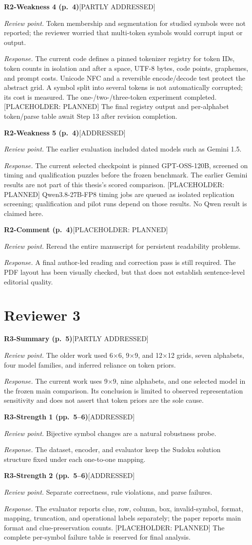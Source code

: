 \documentclass[10pt,a4paper]{article}
\newcommand{\Done}{\textcolor{done}{\textsf{[ADDRESSED]}}}
\newcommand{\Partial}{\textcolor{pending}{\textsf{[PARTLY ADDRESSED]}}}
\newcommand{\Planned}{\textcolor{pending}{\textsf{[PLACEHOLDER: PLANNED]}}}
\newcommand{\itemresponse}[4]{%
  \Needspace{5\baselineskip}%
  \par\vspace{0.65\baselineskip}%
  \noindent\textbf{#1}\quad #2\par
  \noindent\emph{Review point.} #3\par
  \noindent\emph{Response.} #4\par
}
\begin{document}
\itemresponse{R2-Weakness 4 (p.~4)}{\Partial}{Token membership and segmentation for studied symbols were not reported; the reviewer worried that multi-token symbols would corrupt input or output.}{The current code defines a pinned tokenizer registry for token IDs, token counts in isolation and after a space, UTF-8 bytes, code points, graphemes, and prompt costs. Unicode NFC and a reversible encode/decode test protect the abstract grid. A symbol split into several tokens is not automatically corrupted; its cost is measured. The one-/two-/three-token experiment completed. \Planned{} The final registry output and per-alphabet token/parse table await Step 13 after revision completion.}

\itemresponse{R2-Weakness 5 (p.~4)}{\Done}{The earlier evaluation included dated models such as Gemini 1.5.}{The current selected checkpoint is pinned GPT-OSS-120B, screened on timing and qualification puzzles before the frozen benchmark. The earlier Gemini results are not part of this thesis's scored comparison. \Planned{} Qwen3.8-27B-FP8 timing jobs are queued as isolated replication screening; qualification and pilot runs depend on those results. No Qwen result is claimed here.}

\itemresponse{R2-Comment (p.~4)}{\Planned}{Reread the entire manuscript for persistent readability problems.}{A final author-led reading and correction pass is still required. The PDF layout has been visually checked, but that does not establish sentence-level editorial quality.}

\section*{Reviewer 3}

\itemresponse{R3-Summary (p.~5)}{\Partial}{The older work used 6$\times$6, 9$\times$9, and 12$\times$12 grids, seven alphabets, four model families, and inferred reliance on token priors.}{The current work uses 9$\times$9, nine alphabets, and one selected model in the frozen main comparison. Its conclusion is limited to observed representation sensitivity and does not assert that token priors are the sole cause.}

\itemresponse{R3-Strength 1 (pp.~5--6)}{\Done}{Bijective symbol changes are a natural robustness probe.}{The dataset, encoder, and evaluator keep the Sudoku solution structure fixed under each one-to-one mapping.}

\itemresponse{R3-Strength 2 (pp.~5--6)}{\Done}{Separate correctness, rule violations, and parse failures.}{The evaluator reports clue, row, column, box, invalid-symbol, format, mapping, truncation, and operational labels separately; the paper reports main format and clue-preservation counts. \Planned{} The complete per-symbol failure table is reserved for final analysis.}
\end{document}
